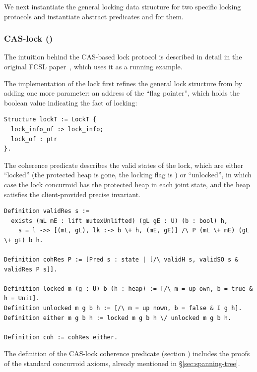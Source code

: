 We next instantiate the general locking data structure for two
specific locking protocols and instantiate abstract predicates
 and  for them.

\subsubsection{CAS-lock ()}
\label{sec:cas-lock}

The intuition behind the CAS-based lock protocol is described in detail
in the original FCSL paper~\cite{Nanevski-al:ESOP14}, which uses it as
a running example.

The implementation of the lock first refines the general lock
structure  from  by adding one more
parameter: an address of the ``flag pointer'', which holds the boolean
value indicating the fact of locking:

\begin{lstlisting}
Structure lockT := LockT {
  lock_info_of :> lock_info;
  lock_of : ptr 
}.  
\end{lstlisting}

The coherence predicate describes the valid states of the lock, which
are either ``locked'' (the protected heap is gone, the locking flag is
) or ``unlocked'', in which case the lock concurroid has
the protected heap  in each joint state, and the heap
satisfies the client-provided precise invariant.

\begin{lstlisting}
Definition validRes s :=
  exists (mL mE : lift mutexUnlifted) (gL gE : U) (b : bool) h,
    s = l ->> [(mL, gL), lk :-> b \+ h, (mE, gE)] /\ P (mL \+ mE) (gL \+ gE) b h.

Definition cohRes P := [Pred s : state | [/\ validH s, validSO s & validRes P s]].

Definition locked m (g : U) b (h : heap) := [/\ m = up own, b = true & h = Unit].
Definition unlocked m g b h := [/\ m = up nown, b = false & I g h].
Definition either m g b h := locked m g b h \/ unlocked m g b h.

Definition coh := cohRes either. 
\end{lstlisting}

The definition of the CAS-lock coherence predicate (section
) includes the proofs of the standard concurroid
axioms, already mentioned in \S \ref{sec:spanning-tree}.

